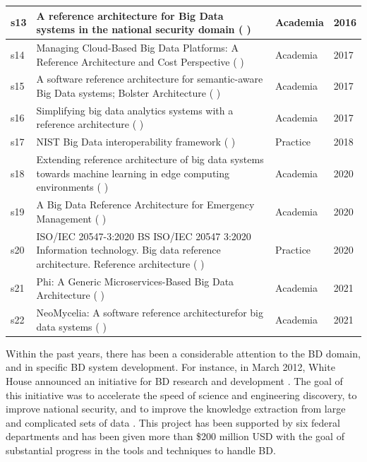 \documentclass{ieeeaccess}
\begin{document}
\begin{table}
\begin{tabular}{|p{0.4cm}|p{14.3cm}|p{1.2cm}|p{0.5cm}|}
    s13 & A reference architecture for Big Data systems in the national security domain (\cite{Klein} ) & Academia  &  2016   \\
    \hline
    s14 & Managing Cloud-Based Big Data Platforms: A Reference Architecture and Cost Perspective (\cite{heilig2017managing} ) & Academia  &  2017   \\
    \hline
    s15 & A software reference architecture for semantic-aware Big Data systems; Bolster Architecture (\cite{Nadal} ) & Academia  &  2017   \\
    \hline
    s16 & Simplifying big data analytics systems with a reference architecture (\cite{sang2017simplifying} ) & Academia  &  2017   \\
    \hline
    s17 & NIST Big Data interoperability framework (\cite{Chang} ) & Practice  &  2018  \\
    \hline
    s18 & Extending reference architecture of big data systems towards machine learning in edge computing environments (\cite{paakkonen2020extending} )  & Academia & 2020   \\
    \hline
    s19 & A Big Data Reference Architecture for Emergency Management (\cite{iglesias2020big} )  & Academia & 2020   \\
    \hline
    s20 & ISO/IEC 20547-3:2020 BS ISO/IEC 20547 3:2020 Information technology. Big data reference architecture. Reference architecture (\cite{ISO20547} ) & Practice  &  2020  \\
    \hline
    s21 & Phi: A Generic Microservices-Based Big Data Architecture (\cite{maamouri2021phi} )  & Academia & 2021   \\
    \hline
    s22 & NeoMycelia: A software reference architecturefor big data systems (\cite{AtaeiApsec} )  & Academia & 2021   \\
    \hline
    \end{tabular}
\end{table}

Within the past years, there has been a considerable attention to the BD domain, and in specific BD system development. For instance, in March 2012, White House announced an initiative for BD research and development \cite{House}. The goal of this initiative was to accelerate the speed of science and engineering discovery, to improve national security, and to improve the knowledge extraction from large and complicated sets of data \cite{chang2015nist}. This project has been supported by six federal departments and has been given more than \$200 million USD with the goal of substantial progress in the tools and techniques to handle BD.
\end{document}
